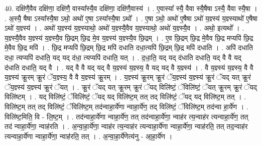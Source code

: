 \documentclass[17pt]{extarticle}
\begin{document}
40. दक्षि॑णै॒वैव दक्षि॑णा॒ दक्षि॑णै॒ वास्या᳚स्यै॒व दक्षि॑णा॒ दक्षि॑णै॒वास्य॑ । . ए॒वास्या᳚ स्यै॒ वैवा स्यै॒षैषा ऽस्यै॒ वैवा स्यै॒षा । . अ॒स्यै॒ षैषा ऽस्या᳚स्यै॒षा ऽथो॒ अथो॑ ए॒षा ऽस्या᳚स्यै॒षा ऽथो᳚ । . ए॒षा ऽथो॒ अथो॑ ए॒षैषा ऽथो॑ य॒ज्ञ्स्य॑ य॒ज्ञ्स्याथो॑ ए॒षैषा ऽथो॑ य॒ज्ञ्स्य॑ । . अथो॑ य॒ज्ञ्स्य॑ य॒ज्ञ्स्याथो॒ अथो॑ य॒ज्ञ्स्यै॒वैव य॒ज्ञ्स्याथो॒ अथो॑ य॒ज्ञ्स्यै॒व । . अथो॒ इत्यथो᳚ । . य॒ज्ञ्स्यै॒वैव य॒ज्ञ्स्य॑ य॒ज्ञ्स्यै॒व छि॒द्रम् छि॒द्र मे॒व य॒ज्ञ्स्य॑ य॒ज्ञ्स्यै॒व छि॒द्रम् । . ए॒व छि॒द्रम् छि॒द्र मे॒वैव छि॒द्र मप्यपि॑ छि॒द्र मे॒वैव छि॒द्र मपि॑ । . छि॒द्र मप्यपि॑ छि॒द्रम् छि॒द्र मपि॑ दधाति दधा॒त्यपि॑ छि॒द्रम् छि॒द्र मपि॑ दधाति । . अपि॑ दधाति दधा॒ त्यप्यपि॑ दधाति॒ यद् यद् द॑धा॒ त्यप्यपि॑ दधाति॒ यत् । . द॒धा॒ति॒ यद् यद् द॑धाति दधाति॒ यद् वै वै यद् द॑धाति दधाति॒ यद् वै । . यद् वै वै यद् यद् वै य॒ज्ञ्स्य॑ य॒ज्ञ्स्य॒ वै यद् यद् वै य॒ज्ञ्स्य॑ । . वै य॒ज्ञ्स्य॑ य॒ज्ञ्स्य॒ वै वै य॒ज्ञ्स्य॑ क्रू॒रम् क्रू॒रं ॅय॒ज्ञ्स्य॒ वै वै य॒ज्ञ्स्य॑ क्रू॒रम् । . य॒ज्ञ्स्य॑ क्रू॒रम् क्रू॒रं ॅय॒ज्ञ्स्य॑ य॒ज्ञ्स्य॑ क्रू॒रं ॅयद् यत् क्रू॒रं ॅय॒ज्ञ्स्य॑ य॒ज्ञ्स्य॑ क्रू॒रं ॅयत् । . क्रू॒रं ॅयद् यत् क्रू॒रम् क्रू॒रं ॅयद् विलि॑ष्टं॒ ॅविलि॑ष्टं॒ ॅयत् क्रू॒रम् क्रू॒रं ॅयद् विलि॑ष्टम् । . यद् विलि॑ष्टं॒ ॅविलि॑ष्टं॒ ॅयद् यद् विलि॑ष्ट॒म् तत् तद् विलि॑ष्टं॒ ॅयद् यद् विलि॑ष्ट॒म् तत् । . विलि॑ष्ट॒म् तत् तद् विलि॑ष्टं॒ ॅविलि॑ष्ट॒म् तद॑न्वाहा॒र्ये॑णा न्वाहा॒र्ये॑ण॒ तद् विलि॑ष्टं॒ ॅविलि॑ष्ट॒म् तद॑न्वा हा॒र्ये॑ण । . विलि॑ष्ट॒मिति॒ वि - लि॒ष्ट॒म् । . तद॑न्वाहा॒र्ये॑णा न्वाहा॒र्ये॑ण॒ तत् तद॑न्वाहा॒र्ये॑णा॒ न्वाह॑र त्य॒न्वाह॑र त्यन्वाहा॒र्ये॑ण॒ तत् तद॑ न्वाहा॒र्ये॑णा॒ न्वाह॑रति । . अ॒न्वा॒हा॒र्ये॑णा॒ न्वाह॑र त्य॒न्वाह॑र त्यन्वाहा॒र्ये॑णा न्वाहा॒र्ये॑णा॒ न्वाह॑रति॒ तत् तद॒न्वाह॑र त्यन्वाहा॒र्ये॑णा न्वाहा॒र्ये॑णा॒ न्वाह॑रति॒ तत् । . अ॒न्वा॒हा॒र्ये॑णेत्य॑नु - आ॒हा॒र्ये॑ण । \newline
\pagebreak
{}
\end{document}

